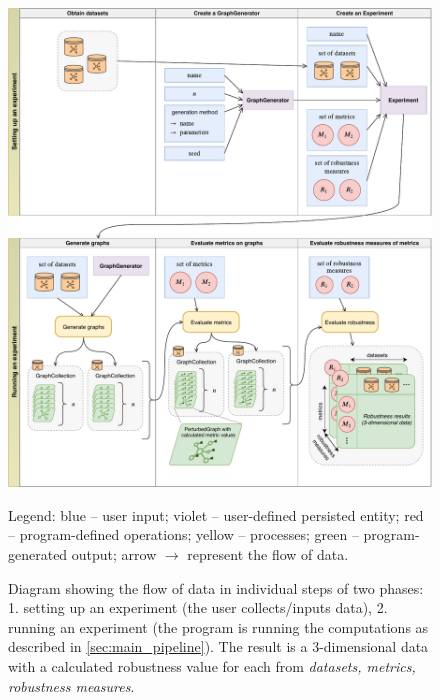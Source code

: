 \begin{figure}
    \includegraphics[width=\linewidth]{main_data_flow.pdf}
    \caption{Diagram showing the flow of data in individual steps of two phases: 1. setting up an experiment (the user collects/inputs data), 2. running an experiment (the program is running the computations as described in \autoref{sec:main_pipeline}). The result is a 3-dimensional data with a calculated robustness value for each from \textsl{datasets, metrics, robustness measures}.}\label{fig:main_data_flow}
    \begin{flushleft}\footnotesize
    Legend: \textcolor{diag-blue}{blue} -- user input; \textcolor{diag-violet}{violet} -- user-defined persisted entity; \textcolor{diag-red}{red} -- program-defined operations; \textcolor{diag-yellow}{yellow} -- processes; \textcolor{diag-green}{green} -- program-generated output; arrow $\rightarrow$ represent the flow of data.
    \end{flushleft}
\end{figure}
